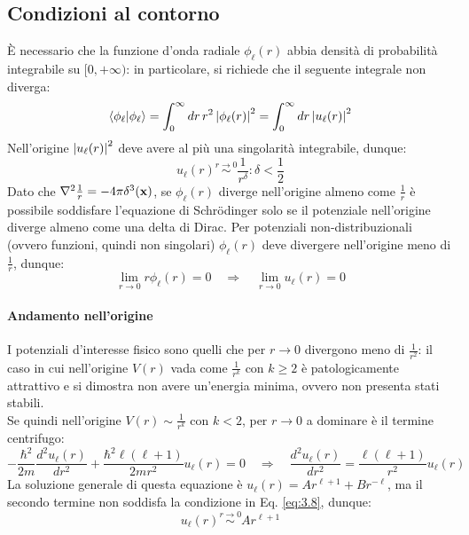 \subsection{Condizioni al contorno}

È necessario che la funzione d'onda radiale $ \phi_{\ell}(r) $ abbia densità di probabilità integrabile su $ [0,+\infty) $: in particolare, si richiede che il seguente integrale non diverga:
\begin{equation}
	\braket{\phi_{\ell} | \phi_{\ell}} = \int_0^{\infty} dr \, r^2 \left\lvert\phi_{\ell}(r)\right\rvert^2 = \int_{0}^{\infty} dr  \left\lvert u_{\ell}(r)\right\rvert^2
	\label{eq:3.6}
\end{equation}
Nell'origine $ \left\lvert u_{\ell}(r)\right\rvert^2 $ deve avere al più una singolarità integrabile, dunque:
\begin{equation}
	u_{\ell}(r) \overset{r \rightarrow 0}{\sim} \frac{1}{r^{\delta}} : \delta < \frac{1}{2}
	\label{eq:3.7}
\end{equation}
Dato che $ \nabla^2 \frac{1}{r} = - 4\pi \delta^3 (\mathbf{x}) $, se $ \phi_{\ell}(r) $ diverge nell'origine almeno come $ \frac{1}{r} $ è possibile soddisfare l'equazione di Schrödinger solo se il potenziale nell'origine diverge almeno come una delta di Dirac. Per potenziali non-distribuzionali (ovvero funzioni, quindi non singolari) $ \phi_{\ell}(r) $ deve divergere nell'origine meno di $ \frac{1}{r} $, dunque:
\begin{equation}
	\lim_{r \rightarrow 0} r \phi_{\ell}(r) = 0 \quad\Longrightarrow\quad \lim_{r \rightarrow 0} u_{\ell}(r) = 0
	\label{eq:3.8}
\end{equation}

\paragraph{Andamento nell'origine}

I potenziali d'interesse fisico sono quelli che per $ r \rightarrow 0 $ divergono meno di $ \frac{1}{r^2} $: il caso in cui nell'origine $ V(r) $ vada come $ \frac{1}{r^k} $ con $ k \ge 2 $ è patologicamente attrattivo e si dimostra non avere un'energia minima, ovvero non presenta stati stabili.\\
Se quindi nell'origine $ V(r) \sim \frac{1}{r^k} $ con $ k < 2 $, per $ r \rightarrow 0 $ a dominare è il termine centrifugo:
\begin{equation}
	- \frac{\hbar^2}{2m} \frac{d^2 u_{\ell}(r)}{d r^2} + \frac{\hbar^2 \ell (\ell + 1)}{2mr^2} u_{\ell}(r) = 0 \quad \Longrightarrow \quad \frac{d^2 u_{\ell}(r)}{d r^2} = \frac{\ell (\ell + 1)}{r^2} u_{\ell}(r)
	\label{eq:3.9}
\end{equation}
La soluzione generale di questa equazione è $ u_{\ell}(r) = A r^{\ell + 1} + B r^{-\ell} $, ma il secondo termine non soddisfa la condizione in Eq. \ref{eq:3.8}, dunque:
\begin{equation}
	u_{\ell}(r) \overset{r \rightarrow 0}{\sim} A r^{\ell + 1}
	\label{eq:3.10}
\end{equation}

